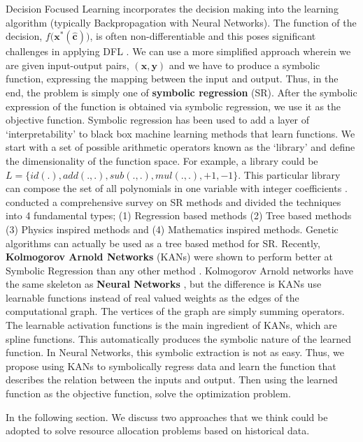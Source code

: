 \documentclass[12pt, letterpaper]{article}
\begin{document}
Decision Focused Learning incorporates the decision making into the learning
algorithm (typically Backpropagation with Neural Networks). The function of the
decision, $f(\mathbf{x^*(\hat{c}))}$, is often non-differentiable and this poses
significant challenges in applying DFL \cite{Mandi_2024}. We can use a more
simplified approach wherein we are given input-output pairs, $\mathbf{(x,y)}$
and we have to produce a symbolic function, expressing the mapping between the
input and output. Thus, in the end, the problem is simply one of
\textbf{symbolic regression} (SR). After the symbolic expression of the function
is obtained via symbolic regression, we use it as the objective function.
Symbolic regression has been used to add a layer of `interpretability' to black
box machine learning methods that learn functions. We start with a set of
possible arithmetic operators known as the `library' and define the
dimensionality of the function space. For example, a library could be $L=\{
id(.), add(.,.), sub(.,.), mul(.,.), +1, -1\}$. This particular library can
compose the set of all polynomials in one variable with integer coefficients
\cite{SR_2024}. \cite{SR_2024} conducted a comprehensive survey on SR methods
and divided the techniques into 4 fundamental types; (1) Regression based
methods (2) Tree based methods (3) Physics inspired methods and (4) Mathematics
inspired methods. Genetic algorithms can actually be used as a tree based method
for SR. Recently, \textbf{Kolmogorov Arnold Networks} (KANs) were shown to
perform better at Symbolic Regression than any other method \cite{kans_2024}
\cite{yu2024kanmlpfairercomparison}. Kolmogorov Arnold networks have the same
skeleton as \textbf{Neural Networks} \cite{rumelhart1986learning}, but the
difference is KANs use learnable functions instead of real valued weights as the
edges of the computational graph. The vertices of the graph are simply summing
operators. The learnable activation functions is the main ingredient of KANs,
which are spline functions. This automatically produces the symbolic nature of
the learned function. In Neural Networks, this symbolic extraction is not as
easy. Thus, we propose using KANs to symbolically regress data and learn the
function that describes the relation between the inputs and output. Then using
the learned function as the objective function, solve the optimization problem.

In the following section. We discuss two approaches that we think could be adopted
to solve resource allocation problems based on historical data. 
\end{document}
